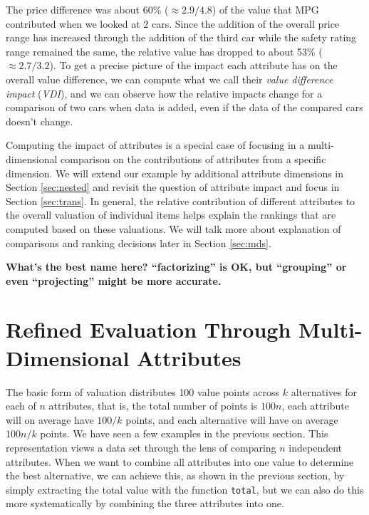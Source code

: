\documentclass{jfp}
\newcommand{\NOTE}[2][gray]{\smallskip\noindent
  \colorbox{#1!30}{\parbox{.98\linewidth}{{\small\textbf{#2}}}}
}
\newcommand{\prog}[1]{\texttt{#1}}
\begin{document}
\noindent
%
The price difference was about 60\% ($\approx2.9/4.8$) of the value that MPG contributed when we looked at 2 cars. Since the addition of the overall price range has increased through the addition of the third car while the safety rating range remained the same, the relative value has dropped to about 53\% ($\approx2.7/3.2$).
%
To get a precise picture of the impact each attribute has on the overall value difference, we can compute what we call their
%
\emph{value difference impact} (\emph{VDI}), and we can observe how the relative impacts change for a comparison of two cars when data is added, even if the data of the compared cars doesn't change.


\noindent
%
Computing the impact of attributes is a special case of focusing in a multi-dimensional comparison on the contributions of attributes from a specific dimension. 
%
We will extend our example by additional attribute dimensions in Section \ref{sec:nested} and revisit the question of attribute impact and focus in Section \ref{sec:trans}.
%
In general, the relative contribution of different attributes to the overall valuation of individual items helps explain the rankings that are computed based on these valuations. We will talk more about explanation of comparisons and ranking decisions later in Section \ref{sec:mds}.

\NOTE{What's the best name here? ``factorizing'' is OK, but ``grouping'' or even ``projecting'' might be more accurate.}



\section{Refined Evaluation Through Multi-Dimensional Attributes}
\label{sec:ahp}
\label{sec:nested}

The basic form of valuation distributes 100 value points across $k$ alternatives for each of $n$ attributes, that is, the total number of points is $100n$, each attribute will on average have $100/k$ points, and each alternative will have on average $100n/k$ points. We have seen a few examples in the previous section.
%
This representation views a data set through the lens of comparing $n$ independent attributes. 
%
When we want to combine all attributes into one value to determine the best alternative, we can achieve this, as shown in the previous section, by simply extracting the total value with the function \prog{total}, but we can also do this more systematically by combining the three attributes into one.
\end{document}
